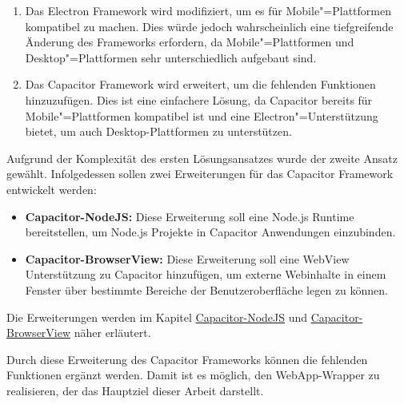 \begin{enumerate}
    \setlength\itemsep{-0.5em}
    \item
    Das Electron Framework wird modifiziert, um es für Mobile"=Plattformen kompatibel zu machen.
    Dies würde jedoch wahrscheinlich eine tiefgreifende Änderung des Frameworks erfordern, da Mobile"=Plattformen und Desktop"=Plattformen sehr unterschiedlich aufgebaut sind.
    \item
    Das Capacitor Framework wird erweitert, um die fehlenden Funktionen hinzuzufügen.
    Dies ist eine einfachere Lösung, da Capacitor bereits für Mobile"=Plattformen kompatibel ist und eine Electron"=Unterstützung bietet, um auch Desktop-Plattformen zu unterstützen.
\end{enumerate}

Aufgrund der Komplexität des ersten Lösungsansatzes wurde der zweite Ansatz gewählt.
Infolgedessen sollen zwei Erweiterungen für das Capacitor Framework entwickelt werden:

\begin{itemize}
    \setlength\itemsep{-0.5em}
    \item \textbf{Capacitor-NodeJS:} Diese Erweiterung soll eine Node.js Runtime bereitstellen, um Node.js Projekte in Capacitor Anwendungen einzubinden.
    \item \textbf{Capacitor-BrowserView:} Diese Erweiterung soll eine WebView Unterstützung zu Capacitor hinzufügen, um externe Webinhalte in einem Fenster über bestimmte Bereiche der Benutzeroberfläche legen zu können.
\end{itemize}

Die Erweiterungen werden im Kapitel \hyperref[sec:Capacitor-NodeJS]{Capacitor-NodeJS} und \hyperref[sec:Capacitor-BrowserView]{Capacitor-BrowserView} näher erläutert.

Durch diese Erweiterung des Capacitor Frameworks können die fehlenden Funktionen ergänzt werden.
Damit ist es möglich, den WebApp-Wrapper zu realisieren, der das Hauptziel dieser Arbeit darstellt.

